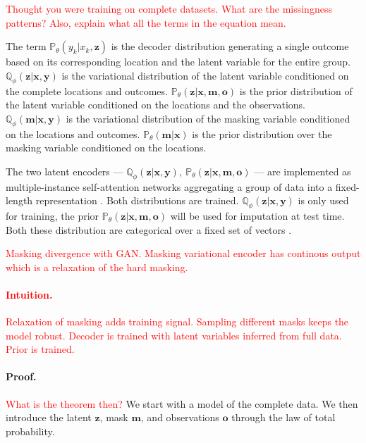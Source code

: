 \documentclass[a4paper,12pt,twoside,openright]{article}
\newcommand{\crit}[1]{\textcolor{red}{#1}}
\begin{document}
\crit{Thought you were training on complete datasets. What are the missingness patterns? Also, explain what all the terms in the equation mean.}

The term $\mathbb{P}_\theta (y_k | x_k, \mathbf{z})$ is the decoder distribution generating a single outcome based on its corresponding location and the latent variable for the entire group. $\mathbb{Q}_\phi (\mathbf{z} | \mathbf{x}, \mathbf{y})$ is the variational distribution of the latent variable conditioned on the complete locations and outcomes. $\mathbb{P}_\theta (\mathbf{z} | \mathbf{x}, \mathbf{m}, \mathbf{o})$ is the prior distribution of the latent variable conditioned on the locations and the observations. $\mathbb{Q}_\phi (\mathbf{m} | \mathbf{x}, \mathbf{y})$ is the variational distribution of the masking variable conditioned on the locations and outcomes. $\mathbb{P}_\theta (\mathbf{m} | \mathbf{x})$ is the prior distribution over the masking variable conditioned on the locations.

The two latent encoders --- $\mathbb{Q}_\phi (\mathbf{z} | \mathbf{x}, \mathbf{y}), ~ \mathbb{P}_\theta (\mathbf{z} | \mathbf{x}, \mathbf{m}, \mathbf{o})$ --- are implemented as multiple-instance self-attention networks aggregating a group of data into a fixed-length representation \parencite{ilseAttentionbasedDeepMultiple2018}. Both distributions are trained. $\mathbb{Q}_\phi (\mathbf{z} | \mathbf{x}, \mathbf{y})$ is only used for training, the prior $\mathbb{P}_\theta (\mathbf{z} | \mathbf{x}, \mathbf{m}, \mathbf{o})$ will be used for imputation at test time. Both these distribution are categorical over a fixed set of vectors \parencite{vandenoordNeuralDiscreteRepresentation2017}.

\crit{Masking divergence with GAN. Masking variational encoder has continous output which is a relaxation of the hard masking.}

\crit{\paragraph{Intuition.} Relaxation of masking adds training signal. Sampling different masks keeps the model robust. Decoder is trained with latent variables inferred from full data. Prior is trained.}

\paragraph{Proof.} \crit{What is the theorem then?} We start with a model of the complete data. We then introduce the latent $\mathbf{z}$, mask $\mathbf{m}$, and observations $\mathbf{o}$ through the law of total probability.
\end{document}
